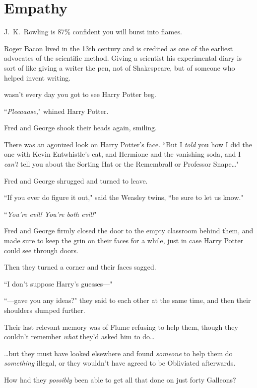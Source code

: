 \chapter{Empathy}

\begin{chapterOpeningAuthorNote}
J.~K.~Rowling is 87\% confident you will burst into flames.

Roger Bacon lived in the 13th century and is credited as one of the earliest advocates of the scientific method. Giving a scientist his experimental diary is sort of like giving a writer the pen, not of Shakespeare, but of someone who helped invent writing.
\end{chapterOpeningAuthorNote}

 wasn't every day you got to see Harry Potter beg.

\hplettrineextrapara
``\emph{Pleeaaase,}" whined Harry Potter.

Fred and George shook their heads again, smiling.

There was an agonized look on Harry Potter's face. ``But I \emph{told} you how I did the one with Kevin Entwhistle's cat, and Hermione and the vanishing soda, and I \emph{can't} tell you about the Sorting Hat or the Remembrall or Professor Snape{\ldots}"

Fred and George shrugged and turned to leave.

``If you ever do figure it out," said the Weasley twins, ``be sure to let us know."

``\emph{You're evil! You're both evil!}"

Fred and George firmly closed the door to the empty classroom behind them, and made sure to keep the grin on their faces for a while, just in case Harry Potter could see through doors.

Then they turned a corner and their faces sagged.

``I don't suppose Harry's guesses---"

``---gave you any ideas?" they said to each other at the same time, and then their shoulders slumped further.

Their last relevant memory was of Flume refusing to help them, though they couldn't remember \emph{what} they'd asked him to do{\ldots}

{\ldots}but they must have looked elsewhere and found \emph{someone} to help them do \emph{something} illegal, or they wouldn't have agreed to be Obliviated afterwards.

How had they \emph{possibly} been able to get all that done on just forty Galleons?

